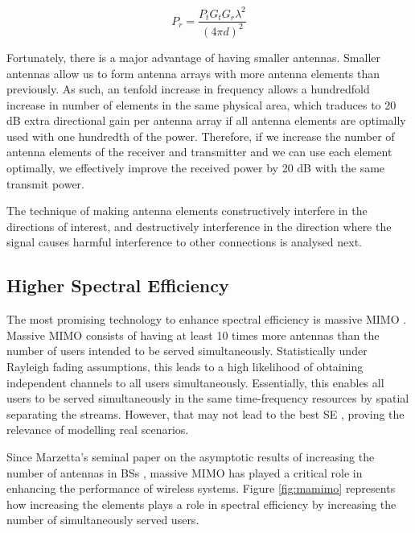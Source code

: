 \begin{equation} \label{eq:Friis2}
    P_r =\frac{P_t G_t G_r \lambda^2}{(4\pi d)^2}
\end{equation}

Fortunately, there is a major advantage of having smaller antennas. Smaller antennas allow us to form antenna arrays with more antenna elements than previously. As such, an tenfold increase in frequency allows a hundredfold increase in number of elements in the same physical area, which traduces to 20 dB extra directional gain per antenna array if all antenna elements are optimally used with one hundredth of the power. Therefore, if we increase the number of antenna elements of the receiver and transmitter and we can use each element optimally, we effectively improve the received power by 20 dB with the same transmit power. 

The technique of making antenna elements constructively interfere in the directions of interest, and destructively interference in the direction where the signal causes harmful interference to other connections is analysed next.


\subsection*{Higher Spectral Efficiency}

The most promising technology to enhance spectral efficiency is massive \ac{MIMO} \cite{8861014}. Massive \ac{MIMO} consists of having at least 10 times more antennas than the number of users intended to be served simultaneously. Statistically under Rayleigh fading assumptions, this leads to a high likelihood of obtaining independent channels to all users simultaneously. Essentially, this enables all users to be served simultaneously in the same time-frequency resources by spatial separating the streams. However, that may not lead to the best \ac{SE} \cite{7294693}, proving the relevance of modelling real scenarios. 

Since Marzetta's seminal paper on the asymptotic results of increasing the number of antennas in \acp{BS} \cite{5595728}, massive \ac{MIMO} has played a critical role in enhancing the performance of wireless systems. Figure \ref{fig:mamimo} represents how increasing the elements plays a role in spectral efficiency by increasing the number of simultaneously served users.



